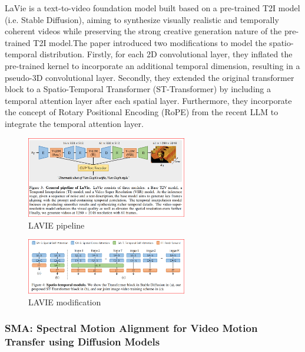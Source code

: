\documentclass[lettersize,journal]{IEEEtran}
\begin{document}
LaVie is a text-to-video foundation model built based on a pre-trained T2I model (i.e. Stable Diffusion), aiming to synthesize visually realistic and temporally coherent videos while preserving the strong creative generation nature of the pre-trained T2I model.The paper introduced two modifications to model the spatio-temporal distribution. Firstly, for each 2D convolutional layer, they inflated the pre-trained kernel to incorporate an additional temporal dimension, resulting in a pseudo-3D convolutional layer. Secondly, they extended the original transformer block to a Spatio-Temporal Transformer (ST-Transformer) by including a temporal attention layer after each spatial layer. Furthermore, they incorporate the concept of Rotary Positional Encoding (RoPE) from the recent LLM to integrate the temporal attention layer.
\begin{figure}[h!]
    \centering
    \includegraphics[width=7cm]{Image/LAVIE pipeline.png}
    \caption{LAVIE pipeline}
    \label{fig-sample}
\end{figure}
\begin{figure}[h!]
    \centering
    \includegraphics[width=7cm]{Image/LAVIE modification.png}
    \caption{LAVIE modification}
    \label{fig-sample}
\end{figure}

\subsubsection{SMA: Spectral Motion Alignment for Video Motion Transfer using Diffusion Models}
\end{document}
